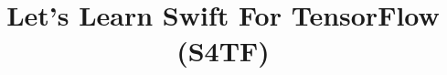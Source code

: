 \documentclass[xcolor=dvipsnames,compress,t,pdf]{beamer}
\title[\insertframenumber /\inserttotalframenumber]{Let's Learn Swift For TensorFlow (S4TF)}
\begin{document}
	\begin{frame}
	\titlepage
	\end{frame}

	
	
\end{document}
